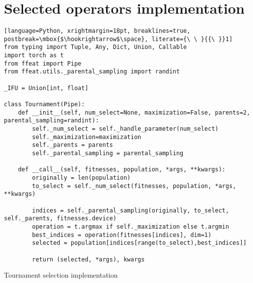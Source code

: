 \chapter{Selected operators implementation}
\label{chap:impl}

\begin{algorithm}
\begin{lstlisting}[language=Python, xrightmargin=18pt, breaklines=true, postbreak=\mbox{$\hookrightarrow$\space}, literate={\ \ }{{\ }}1]
from typing import Tuple, Any, Dict, Union, Callable
import torch as t
from ffeat import Pipe
from ffeat.utils._parental_sampling import randint

_IFU = Union[int, float]

class Tournament(Pipe):
    def __init__(self, num_select=None, maximization=False, parents=2, parental_sampling=randint):
        self._num_select = self._handle_parameter(num_select)
        self._maximization=maximization
        self._parents = parents
        self._parental_sampling = parental_sampling

    def __call__(self, fitnesses, population, *args, **kwargs):
        originally = len(population)
        to_select = self._num_select(fitnesses, population, *args, **kwargs)

        indices = self._parental_sampling(originally, to_select, self._parents, fitnesses.device)
        operation = t.argmax if self._maximization else t.argmin
        best_indices = operation(fitnesses[indices], dim=1)
        selected = population[indices[range(to_select),best_indices]]

        return (selected, *args), kwargs
\end{lstlisting}
\caption{Tournament selection implementation}
\label{alg:impltournament}
\end{algorithm}

